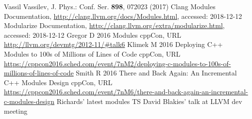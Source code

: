 \documentclass{webofc}
\begin{document}
\begin{thebibliography}{}

Vassil Vassilev, J. Phys.: Conf. Ser. \textbf{898}, 072023 (2017)
Clang Modules Documentation, \url{http://clang.llvm.org/docs/Modules.html}, accessed: 2018-12-12
Modularize Documentation, \url{http://clang.llvm.org/extra/modularize.html}, accessed: 2018-12-12
Gregor D 2016 Modules cppCon, URL \url{http://llvm.org/devmtg/2012-11/#talk6}
Klimek M 2016 Deploying C++ Modules to 100s of Millions of Lines of Code cppCon, URL \url{https://cppcon2016.sched.com/event/7nM2/deploying-c-modules-to-100s-of-millions-of-lines-of-code}
Smith R 2016 There and Back Again: An Incremental C++ Modules Design cppCon, URL \url{https://cppcon2016.sched.com/event/7nM6/there-and-back-again-an-incremental-c-modules-design}
Richards' latest modules TS
David Blakies' talk at LLVM dev meeting

\end{thebibliography}
\end{document}
